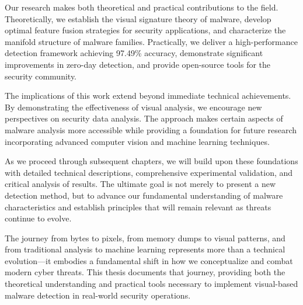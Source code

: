 Our research makes both theoretical and practical contributions to the field. Theoretically, we establish the visual signature theory of malware, develop optimal feature fusion strategies for security applications, and characterize the manifold structure of malware families. Practically, we deliver a high-performance detection framework achieving 97.49\% accuracy, demonstrate significant improvements in zero-day detection, and provide open-source tools for the security community.

The implications of this work extend beyond immediate technical achievements. By demonstrating the effectiveness of visual analysis, we encourage new perspectives on security data analysis. The approach makes certain aspects of malware analysis more accessible while providing a foundation for future research incorporating advanced computer vision and machine learning techniques.

As we proceed through subsequent chapters, we will build upon these foundations with detailed technical descriptions, comprehensive experimental validation, and critical analysis of results. The ultimate goal is not merely to present a new detection method, but to advance our fundamental understanding of malware characteristics and establish principles that will remain relevant as threats continue to evolve.

The journey from bytes to pixels, from memory dumps to visual patterns, and from traditional analysis to machine learning represents more than a technical evolution—it embodies a fundamental shift in how we conceptualize and combat modern cyber threats. This thesis documents that journey, providing both the theoretical understanding and practical tools necessary to implement visual-based malware detection in real-world security operations.
